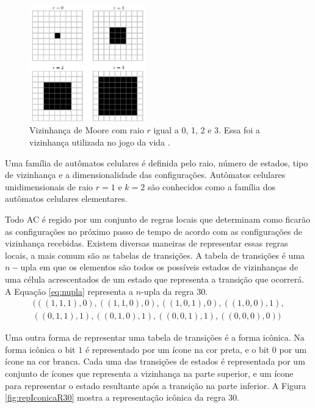 \documentclass[12pt,a4paper]{article}
\begin{document}
	\begin{figure}[h!]
	  \centering
  	  \includegraphics[width=0.45\textwidth]{fig_vMoore.pdf}
	  \caption{Vizinhança de Moore com raio $r$ igual a 0, 1, 2 e 3. Essa foi a vizinhança utilizada no jogo da vida \cite{weisstein2015c}.}
	  \label{fig:vMoore}
	\end{figure}

Uma família de autômatos celulares é definida pelo raio, número de estados, tipo de vizinhança e a dimensionalidade das configurações. Autômatos celulares unidimensionais de raio $r=1$ e $k=2$ são conhecidos como a família dos autômatos celulares elementares.

Todo AC é regido por um conjunto de regras locais que determinam como ficarão as configurações no próximo passo de tempo de acordo com as configurações de vizinhança recebidas. Existem diversas maneiras de representar essas regras locais, a mais comum são as tabelas de transições. A tabela de transições é uma $n-$upla em que os elementos são todos os possíveis estados de vizinhanças de uma célula acrescentados de um estado que representa a transição que ocorrerá. A Equação \ref{eq:nupla} representa a $n$-upla da regra 30.
\begin{equation}
\begin{split}
(((1,1,1),0),((1,1,0),0),((1,0,1),0),((1,0,0),1),\\
((0,1,1),1),((0,1,0),1),((0,0,1),1),((0,0,0),0))
\label{eq:nupla}
\end{split}
\end{equation}

Uma outra forma de representar uma tabela de transições é a forma icônica. Na forma icônica o bit $1$ é representado por um ícone na cor preta, e o bit $0$ por um ícone na cor branca. Cada uma das transições de estados é representada por um conjunto de ícones que representa a vizinhança na parte superior, e um ícone para representar o estado resultante após a transição na parte inferior. A Figura \ref{fig:repIconicaR30} mostra a representação icônica da regra 30.
\end{document}
